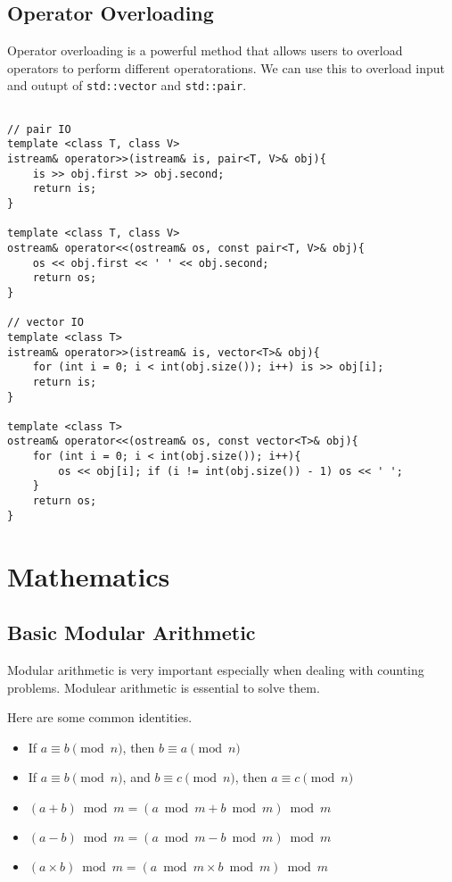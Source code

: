 \documentclass{article}
\begin{document}
\subsection{Operator Overloading}

Operator overloading is a powerful method that allows users to overload operators to perform different operatorations. 
We can use this to overload input and outupt of \texttt{std::vector} and \texttt{std::pair}.

\begin{verbatim}
    
// pair IO
template <class T, class V>
istream& operator>>(istream& is, pair<T, V>& obj){
    is >> obj.first >> obj.second;
    return is;
}

template <class T, class V>
ostream& operator<<(ostream& os, const pair<T, V>& obj){
    os << obj.first << ' ' << obj.second;
    return os;
}

// vector IO
template <class T>
istream& operator>>(istream& is, vector<T>& obj){
    for (int i = 0; i < int(obj.size()); i++) is >> obj[i];
    return is;
}

template <class T>
ostream& operator<<(ostream& os, const vector<T>& obj){
    for (int i = 0; i < int(obj.size()); i++){
        os << obj[i]; if (i != int(obj.size()) - 1) os << ' ';
    }
    return os;
}

\end{verbatim}

\section{Mathematics}
\subsection{Basic Modular Arithmetic}
Modular arithmetic is very important especially when dealing with counting problems.
Modulear arithmetic is essential to solve them.

Here are some common identities.

\begin{itemize}
    \item If $a \equiv b \pmod{n}$, then $b \equiv a \pmod{n}$
    \item If $a \equiv b \pmod{n}$, and $b \equiv c \pmod{n}$, then $a \equiv c \pmod{n}$
    \item $(a + b) \bmod{m} = (a \bmod{m} + b \bmod{m}) \bmod{m}$
    \item $(a - b) \bmod{m} = (a \bmod{m} - b \bmod{m}) \bmod{m}$
    \item $(a \times b) \bmod{m} = (a \bmod{m} \times b \bmod{m}) \bmod{m}$
\end{itemize}
\end{document}
